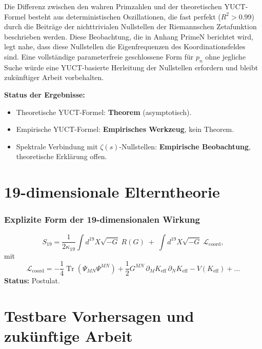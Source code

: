 \documentclass[11pt,a4paper]{article}
\DeclareMathOperator{\Tr}{Tr}
\begin{document}
	Die Differenz zwischen den wahren Primzahlen und der theoretischen YUCT-Formel besteht aus deterministischen Oszillationen, die fast perfekt (\(R^2>0.99\)) durch die Beiträge der nichttrivialen Nullstellen der Riemannschen Zetafunktion beschrieben werden. Diese Beobachtung, die in Anhang PrimeN berichtet wird, legt nahe, dass diese Nullstellen die Eigenfrequenzen des Koordinationsfeldes sind. Eine vollständige parameterfreie geschlossene Form für \(p_n\) ohne jegliche Suche würde eine YUCT-basierte Herleitung der Nullstellen erfordern und bleibt zukünftiger Arbeit vorbehalten.
	
	\textbf{Status der Ergebnisse:}
	\begin{itemize}
		\item Theoretische YUCT-Formel: \textbf{Theorem} (asymptotisch).
		\item Empirische YUCT-Formel: \textbf{Empirisches Werkzeug}, kein Theorem.
		\item Spektrale Verbindung mit \(\zeta(s)\)-Nullstellen: \textbf{Empirische Beobachtung}, theoretische Erklärung offen.
	\end{itemize}
	
	\part{19-dimensionale Elterntheorie}
	
	\section{Explizite Form der 19-dimensionalen Wirkung}
	\label{sec:19Dlagrangian}
	\[
	S_{19} = \frac{1}{2\kappa_{19}} \int d^{19}X \sqrt{-G}\; R(G) \;+\; \int d^{19}X \sqrt{-G}\; \mathcal{L}_{\text{coord}},
	\]
	mit
	\[
	\mathcal{L}_{\text{coord}} = -\frac{1}{4} \Tr(\Psi_{MN}\Psi^{MN}) + \frac{1}{2} G^{MN}\,\partial_M K_{\mathrm{eff}}\,\partial_N K_{\mathrm{eff}} - V(K_{\mathrm{eff}}) + \dots
	\]
	\textbf{Status:} Postulat.
	
	\part{Testbare Vorhersagen und zukünftige Arbeit}
	
\end{document}
